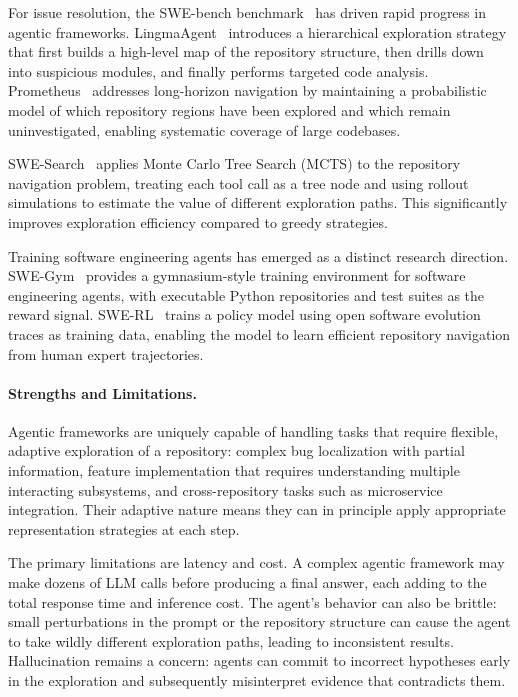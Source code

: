 For issue resolution, the SWE-bench benchmark~\cite{jimenez2024swebench} has driven rapid
progress in agentic frameworks. LingmaAgent~\cite{ma2025lingma} introduces a hierarchical
exploration strategy that first builds a high-level map of the repository structure, then
drills down into suspicious modules, and finally performs targeted code analysis. Prometheus~\cite{pan2026prometheus}
addresses long-horizon navigation by maintaining a probabilistic model of which repository
regions have been explored and which remain uninvestigated, enabling systematic coverage of
large codebases.

SWE-Search~\cite{antoniades2024swesearch} applies Monte Carlo Tree Search (MCTS) to the
repository navigation problem, treating each tool call as a tree node and using rollout
simulations to estimate the value of different exploration paths. This significantly improves
exploration efficiency compared to greedy strategies.

Training software engineering agents has emerged as a distinct research direction.
SWE-Gym~\cite{pan2025training} provides a gymnasium-style training environment for software
engineering agents, with executable Python repositories and test suites as the reward signal.
SWE-RL~\cite{wei2025swerl} trains a policy model using open software evolution traces as
training data, enabling the model to learn efficient repository navigation from human expert
trajectories.

\paragraph{Strengths and Limitations.}
Agentic frameworks are uniquely capable of handling tasks that require flexible, adaptive
exploration of a repository: complex bug localization with partial information, feature
implementation that requires understanding multiple interacting subsystems, and cross-repository
tasks such as microservice integration. Their adaptive nature means they can in principle apply
appropriate representation strategies at each step.

The primary limitations are latency and cost. A complex agentic framework may make dozens of
LLM calls before producing a final answer, each adding to the total response time and
inference cost. The agent's behavior can also be brittle: small perturbations in the prompt
or the repository structure can cause the agent to take wildly different exploration paths,
leading to inconsistent results. Hallucination remains a concern: agents can commit to
incorrect hypotheses early in the exploration and subsequently misinterpret evidence that
contradicts them.


